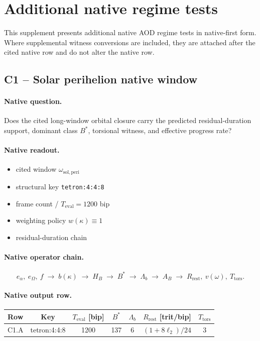\section{Additional native regime tests}\label{app:native-regime-tests}

This supplement presents additional native AOD regime tests in native-first form. Where supplemental witness conversions are included, they are attached after the cited native row and do not alter the native row.

\subsection{C1 -- Solar perihelion native window}\label{app:c1}
\paragraph{Native question.} Does the cited long-window orbital closure carry the predicted residual-duration support, dominant class $B^*$, torsional witness, and effective progress rate?
\paragraph{Native readout.}
\begin{itemize}
\item cited window $\omega_{\mathrm{sol,peri}}$
\item structural key \texttt{tetron:4:4:8}
\item frame count / $T_{\mathrm{eval}}=1200$ bip
\item weighting policy $w(\kappa)\equiv 1$
\item residual-duration chain
\end{itemize}
\paragraph{Native operator chain.}
\[
e_\alpha,\ e_\Omega,\ f
\;\to\;
b(\kappa)
\;\to\;
H_B
\;\to\;
B^*
\;\to\;
\Lambda_b
\;\to\;
A_B
\;\to\;
R_{\mathrm{rest}},\ v(\omega),\ T_{\mathrm{tors}}.
\]
\paragraph{Native output row.}
\begin{center}
\small
\begin{tabular}{lcccccc}
\toprule
Row & Key & $T_{\mathrm{eval}}$ [bip] & $B^*$ & $\Lambda_b$ & $R_{\mathrm{rest}}$ [trit/bip] & $T_{\mathrm{tors}}$ \\
\midrule
C1.A & tetron:4:4:8 & 1200 & 137 & 6 & $(1+8\ell_2)/24$ & 3 \\
\bottomrule
\end{tabular}
\end{center}
